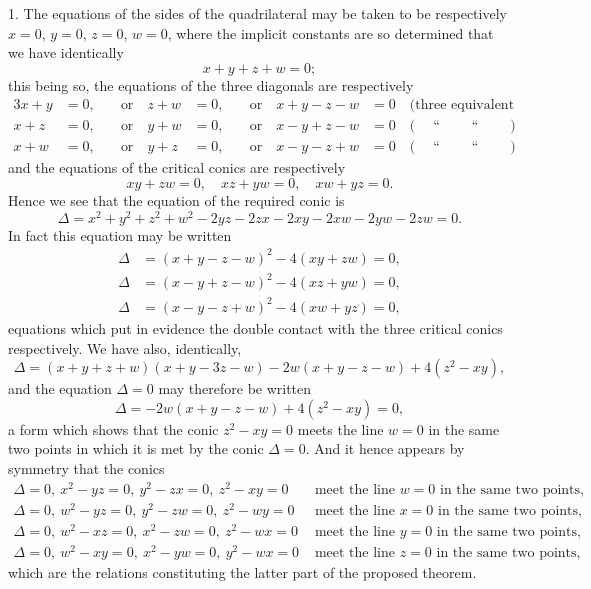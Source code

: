 \documentclass[11pt,a4paper]{article}
\begin{document}
1. The equations of the sides of the quadrilateral may be taken to be respectively
$x=0$, $y=0$, $z=0$, $w=0$, where the implicit constants are so determined that we have
identically
\[
x + y + z + w = 0;
\]
this being so, the equations of the three diagonals are respectively
\begin{alignat*}{3}
x+y&=0, &\quad \text{or}\quad z+w&=0, &\quad \text{or}\quad x+y-z-w&=0 \quad \text{(three equivalent forms)}\\
x+z&=0, &\quad \text{or}\quad y+w&=0, &\quad \text{or}\quad x-y+z-w&=0 \quad \text{(}\quad\;\text{``}\quad\quad\;\text{``}\quad\quad\;\text{)}\\
x+w&=0, &\quad \text{or}\quad y+z&=0, &\quad \text{or}\quad x-y-z+w&=0 \quad \text{(}\quad\;\text{``}\quad\quad\;\text{``}\quad\quad\;\text{)}
\end{alignat*}
and the equations of the critical conics are respectively
\[
xy + zw = 0, \quad xz + yw = 0, \quad xw + yz = 0.
\]
Hence we see that the equation of the required conic is
\[
\Delta = x^2 + y^2 + z^2 + w^2 - 2yz - 2zx - 2xy - 2xw - 2yw - 2zw = 0.
\]
In fact this equation may be written
\begin{align*}
\Delta &= (x+y-z-w)^2 - 4(xy+zw) = 0,\\
\Delta &= (x-y+z-w)^2 - 4(xz+yw) = 0,\\
\Delta &= (x-y-z+w)^2 - 4(xw+yz) = 0,
\end{align*}
equations which put in evidence the double contact with the three critical conics
respectively. We have also, identically,
\[
\Delta = (x+y+z+w)(x+y-3z-w) - 2w(x+y-z-w) + 4(z^2-xy),
\]
and the equation $\Delta=0$ may therefore be written
\[
\Delta = -2w(x+y-z-w) + 4(z^2-xy) = 0,
\]
a form which shows that the conic $z^2-xy=0$ meets the line $w=0$ in the same two
points in which it is met by the conic $\Delta=0$. And it hence appears by symmetry that
the conics
\begin{align*}
\Delta=0,\ x^2-yz=0,\ y^2-zx=0,\ z^2-xy=0 &\text{ meet the line } w=0 \text{ in the same two points},\\
\Delta=0,\ w^2-yz=0,\ y^2-zw=0,\ z^2-wy=0 &\text{ meet the line } x=0 \text{ in the same two points},\\
\Delta=0,\ w^2-xz=0,\ x^2-zw=0,\ z^2-wx=0 &\text{ meet the line } y=0 \text{ in the same two points},\\
\Delta=0,\ w^2-xy=0,\ x^2-yw=0,\ y^2-wx=0 &\text{ meet the line } z=0 \text{ in the same two points},
\end{align*}
which are the relations constituting the latter part of the proposed theorem.
\end{document}
